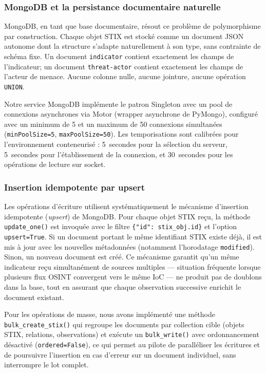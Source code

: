 \subsubsection{MongoDB et la persistance documentaire naturelle}

MongoDB, en tant que base documentaire, résout ce problème de polymorphisme par construction. Chaque objet STIX est stocké comme un document JSON autonome dont la structure s'adapte naturellement à son type, sans contrainte de schéma fixe. Un document \texttt{indicator} contient exactement les champs de l'indicateur; un document \texttt{threat-actor} contient exactement les champs de l'acteur de menace. Aucune colonne nulle, aucune jointure, aucune opération \texttt{UNION}.

Notre service MongoDB implémente le patron Singleton avec un pool de connexions asynchrones via Motor (wrapper asynchrone de PyMongo), configuré avec un minimum de 5 et un maximum de 50 connexions simultanées (\texttt{minPoolSize=5}, \texttt{maxPoolSize=50}). Les temporisations sont calibrées pour l'environnement conteneurisé : 5~secondes pour la sélection du serveur, 5~secondes pour l'établissement de la connexion, et 30~secondes pour les opérations de lecture sur socket.

\subsubsection{Insertion idempotente par upsert}

Les opérations d'écriture utilisent systématiquement le mécanisme d'insertion idempotente (\textit{upsert}) de MongoDB. Pour chaque objet STIX reçu, la méthode \texttt{update\_one()} est invoquée avec le filtre \texttt{\{"id": stix\_obj.id\}} et l'option \texttt{upsert=True}. Si un document portant le même identifiant STIX existe déjà, il est mis à jour avec les nouvelles métadonnées (notamment l'horodatage \texttt{modified}). Sinon, un nouveau document est créé. Ce mécanisme garantit qu'un même indicateur reçu simultanément de sources multiples --- situation fréquente lorsque plusieurs flux OSINT convergent vers le même IoC --- ne produit pas de doublons dans la base, tout en assurant que chaque observation successive enrichit le document existant.

Pour les opérations de masse, nous avons implémenté une méthode \texttt{bulk\_create\_stix()} qui regroupe les documents par collection cible (objets STIX, relations, observations) et exécute un \texttt{bulk\_write()} avec ordonnancement désactivé (\texttt{ordered=False}), ce qui permet au pilote de paralléliser les écritures et de poursuivre l'insertion en cas d'erreur sur un document individuel, sans interrompre le lot complet.

